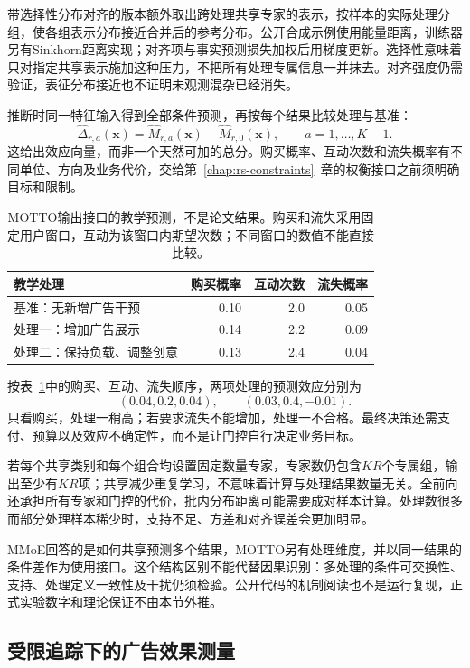 带选择性分布对齐的版本额外取出跨处理共享专家的表示，按样本的实际处理分组，使各组表示分布接近合并后的参考分布。公开合成示例使用能量距离，训练器另有Sinkhorn距离实现；对齐项与事实预测损失加权后用梯度更新。选择性意味着只对指定共享表示施加这种压力，不把所有处理专属信息一并抹去。对齐强度仍需验证，表征分布接近也不证明未观测混杂已经消失。

推断时同一特征输入得到全部条件预测，再按每个结果比较处理与基准：
\[
  \widehat\Delta_{r,a}(\bm{x})
    =\widehat M_{r,a}(\bm{x})-\widehat M_{r,0}(\bm{x}),
      \qquad a=1,\ldots,K-1.
\]
这给出效应向量，而非一个天然可加的总分。购买概率、互动次数和流失概率有不同单位、方向及业务代价，交给第~\ref{chap:rs-constraints}~章的权衡接口之前须明确目标和限制。

\begin{table}[htbp]
  \centering
  \begin{tabularx}{\linewidth}{@{}Xrrr@{}}
    \toprule
    教学处理 & 购买概率 & 互动次数 & 流失概率\\
    \midrule
    基准：无新增广告干预 & 0.10 & 2.0 & 0.05\\
    处理一：增加广告展示 & 0.14 & 2.2 & 0.09\\
    处理二：保持负载、调整创意 & 0.13 & 2.4 & 0.04\\
    \bottomrule
  \end{tabularx}
  \caption{MOTTO输出接口的教学预测，不是论文结果。购买和流失采用固定用户窗口，互动为该窗口内期望次数；不同窗口的数值不能直接比较。}
  \label{tab:rs-advertising-motto}
\end{table}

按表~\ref{tab:rs-advertising-motto}中的购买、互动、流失顺序，两项处理的预测效应分别为
\[
  (0.04,0.2,0.04),\qquad (0.03,0.4,-0.01).
\]
只看购买，处理一稍高；若要求流失不能增加，处理一不合格。最终决策还需支付、预算以及效应不确定性，而不是让门控自行决定业务目标。

若每个共享类别和每个组合均设置固定数量专家，专家数仍包含$KR$个专属组，输出至少有$KR$项；共享减少重复学习，不意味着计算与处理结果数量无关。全前向还承担所有专家和门控的代价，批内分布距离可能需要成对样本计算。处理数很多而部分处理样本稀少时，支持不足、方差和对齐误差会更加明显。

MMoE回答的是如何共享预测多个结果，MOTTO另有处理维度，并以同一结果的条件差作为使用接口。这个结构区别不能代替因果识别：多处理的条件可交换性、支持、处理定义一致性及干扰仍须检验。公开代码的机制阅读也不是运行复现，正式实验数字和理论保证不由本节外推。

\subsection{受限追踪下的广告效果测量}
\label{sec:rs-advertising-limited-tracking}

